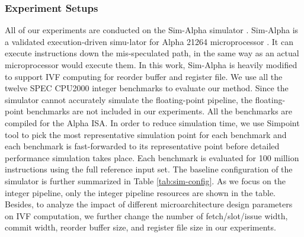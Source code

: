 \subsubsection{Experiment Setups}
All of our experiments are conducted on the Sim-Alpha simulator \cite{desikan2001sim}. Sim-Alpha is a validated execution-driven simu-lator for Alpha 21264 microprocessor \cite{kessler1999alpha}. It can execute instructions down the mis-speculated path, in the same way as an actual microprocessor would execute them. In this work, Sim-Alpha is heavily modified to support IVF computing for reorder buffer and register file. We use all the twelve SPEC CPU2000 integer benchmarks to evaluate our method. Since the simulator cannot accurately simulate the floating-point pipeline, the floating-point benchmarks are not included in our experiments. All the benchmarks are compiled for the Alpha ISA. In order to reduce simulation time, we use Simpoint tool \cite{sherwood2002automatically} to pick the most representative simulation point for each benchmark and each benchmark is fast-forwarded to its representative point before detailed performance simulation takes place. Each benchmark is evaluated for 100 million instructions using the full reference input set. The baseline configuration of the simulator is further summarized in Table \ref{tab:sim-config}. As we focus on the integer pipeline, only the integer pipeline resources are shown in the table. Besides, to analyze the impact of different microarchitecture design parameters on IVF computation, we further change the number of fetch/slot/issue width, commit width, reorder buffer size, and register file size in our experiments.

